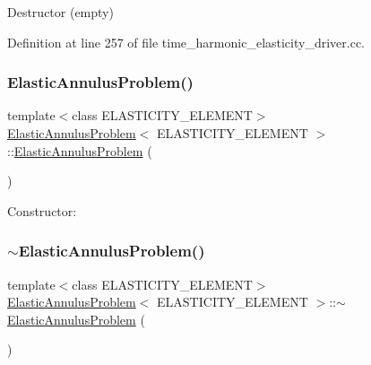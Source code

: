 Destructor (empty) 



Definition at line 257 of file time\+\_\+harmonic\+\_\+elasticity\+\_\+driver.\+cc.

\mbox{\label{classElasticAnnulusProblem_aedf3d30576ccc20e2d8aa809cf075228}} 
\subsubsection{\texorpdfstring{Elastic\+Annulus\+Problem()}{ElasticAnnulusProblem()}\hspace{0.1cm}{\footnotesize\ttfamily [2/2]}}
{\footnotesize\ttfamily template$<$class E\+L\+A\+S\+T\+I\+C\+I\+T\+Y\+\_\+\+E\+L\+E\+M\+E\+NT$>$ \\
\hyperlink{classElasticAnnulusProblem}{Elastic\+Annulus\+Problem}$<$ E\+L\+A\+S\+T\+I\+C\+I\+T\+Y\+\_\+\+E\+L\+E\+M\+E\+NT $>$\+::\hyperlink{classElasticAnnulusProblem}{Elastic\+Annulus\+Problem} (\begin{DoxyParamCaption}{ }\end{DoxyParamCaption})}



Constructor\+: 

\mbox{\label{classElasticAnnulusProblem_a7e791acd99dc0ae25ab9f2e2fd07c587}} 
\subsubsection{\texorpdfstring{$\sim$\+Elastic\+Annulus\+Problem()}{~ElasticAnnulusProblem()}\hspace{0.1cm}{\footnotesize\ttfamily [2/2]}}
{\footnotesize\ttfamily template$<$class E\+L\+A\+S\+T\+I\+C\+I\+T\+Y\+\_\+\+E\+L\+E\+M\+E\+NT$>$ \\
\hyperlink{classElasticAnnulusProblem}{Elastic\+Annulus\+Problem}$<$ E\+L\+A\+S\+T\+I\+C\+I\+T\+Y\+\_\+\+E\+L\+E\+M\+E\+NT $>$\+::$\sim$\hyperlink{classElasticAnnulusProblem}{Elastic\+Annulus\+Problem} (\begin{DoxyParamCaption}{ }\end{DoxyParamCaption})\hspace{0.3cm}{\ttfamily [inline]}}



